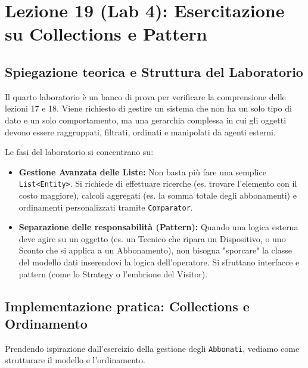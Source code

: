 \documentclass[12pt, a4paper]{article}
\begin{document}
\section{Lezione 19 (Lab 4): Esercitazione su Collections e Pattern}

\subsection{Spiegazione teorica e Struttura del Laboratorio}
Il quarto laboratorio è un banco di prova per verificare la comprensione delle lezioni 17 e 18. Viene richiesto di gestire un sistema che non ha un solo tipo di dato e un solo comportamento, ma una gerarchia complessa in cui gli oggetti devono essere raggruppati, filtrati, ordinati e manipolati da agenti esterni.

Le fasi del laboratorio si concentrano su:
\begin{itemize}
    \item \textbf{Gestione Avanzata delle Liste:} Non basta più fare una semplice \texttt{List<Entity>}. Si richiede di effettuare ricerche (es. trovare l'elemento con il costo maggiore), calcoli aggregati (es. la somma totale degli abbonamenti) e ordinamenti personalizzati tramite \texttt{Comparator}.
    \item \textbf{Separazione delle responsabilità (Pattern):} Quando una logica esterna deve agire su un oggetto (es. un Tecnico che ripara un Dispositivo, o uno Sconto che si applica a un Abbonamento), non bisogna "sporcare" la classe del modello dati inserendovi la logica dell'operatore. Si sfruttano interfacce e pattern (come lo Strategy o l'embrione del Visitor).
\end{itemize}

\newpage

\subsection{Implementazione pratica: Collections e Ordinamento}
Prendendo ispirazione dall'esercizio della gestione degli \texttt{Abbonati}, vediamo come strutturare il modello e l'ordinamento.
\end{document}
